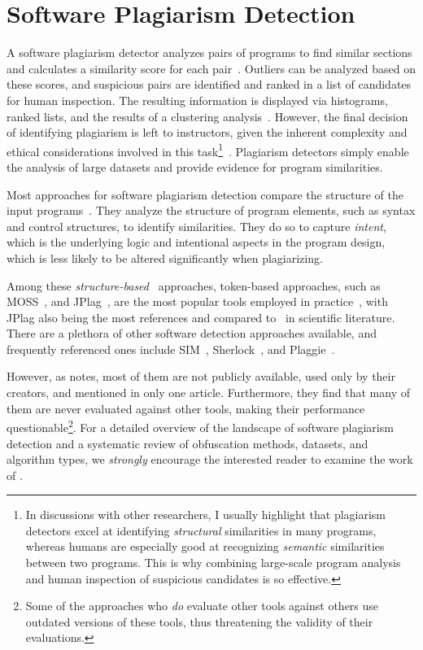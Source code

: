 \section{Software Plagiarism Detection}\label{sec:SPD}
A software plagiarism detector analyzes pairs of programs to find similar sections and calculates a similarity score for each pair~\cite{Ottenstein1976}.
Outliers can be analyzed based on these scores, and suspicious pairs are identified and ranked in a list of candidates for human inspection. The resulting information is displayed via histograms, ranked lists, and the results of a clustering analysis~\cite{Novak2021,prechelt2000}.
However, the final decision of identifying plagiarism is left to instructors, given the inherent complexity and ethical considerations involved in this task\footnote{In discussions with other researchers, I usually highlight that plagiarism detectors excel at identifying \textit{structural} similarities in many programs, whereas humans are especially good at recognizing \textit{semantic} similarities between two programs. This is why combining large-scale program analysis and human inspection of suspicious candidates is so effective.}~\cite{Culwin2001, Weber2019}. Plagiarism detectors simply enable the analysis of large datasets and provide evidence for program similarities.

Most approaches for software plagiarism detection compare the structure of the input programs~\cite{Nichols2019, Novak2019}.
They analyze the structure of program elements, such as syntax and control structures, to identify similarities. They do so to capture \textit{intent}, which is the underlying logic and intentional aspects in the program design, which is less likely to be altered significantly when plagiarizing.

Among these \textit{structure-based}~\cite{Nichols2019} approaches, token-based approaches, such as MOSS~\cite{MOSS}, and JPlag~\cite{prechelt2000}, are the most popular tools employed in practice~\cite{Aniceto2021}, with JPlag also being the most references and compared to~\cite{Novak2019} in scientific literature.
%
There are a plethora of other software detection approaches available, and frequently referenced ones include SIM~\cite{SIM}, Sherlock~\cite{Joy1999}, and Plaggie~\cite{Plaggie}.

However, as \citet{Novak2019} notes, most of them are not publicly available, used only by their creators, and mentioned in only one article. Furthermore, they find that many of them are never evaluated against other tools, making their performance questionable\footnote{Some of the approaches who \textit{do} evaluate other tools against others use outdated versions of these tools, thus threatening the validity of their evaluations.}.
%
For a detailed overview of the landscape of software plagiarism detection and a systematic review of obfuscation methods, datasets, and algorithm types, we \textit{strongly} encourage the interested reader to examine the work of \textcite{Novak2019}.

